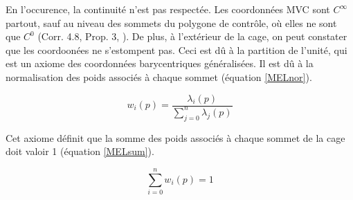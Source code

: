 En l'occurence, la continuité n'est pas respectée. Les coordonnées MVC
sont $C^\infty$ partout, sauf au niveau des sommets du polygone de
contrôle, où elles ne sont que $C^0$ (Corr. 4.8, Prop. 3,
\cite{HF06}). De plus, à l'extérieur de la cage, on peut constater que
les coordoonées ne s'estompent pas. Ceci est dû à la partition de
l'unité, qui est un axiome des coordonnées barycentriques
généralisées. Il est dû à la normalisation des poids associés à chaque
sommet (équation \ref{MELnor}).

\begin{equation}
  w_i(p) = \frac{\lambda_i(p)}{\sum_{j=0}^n \lambda_j(p)}
  \label{MELnor}
\end{equation}

Cet axiome définit que la somme des poids associés à chaque sommet de
la cage doit valoir 1 (équation \ref{MELsum}).

\begin{equation}
  \sum_{i=0}^n w_i(p) = 1
  \label{MELsum}
\end{equation}



